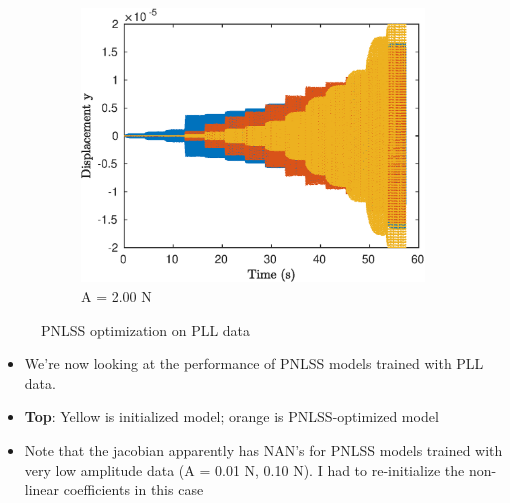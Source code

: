 \documentclass[aspectratio=169]{beamer}
\begin{document}
\begin{frame}[allowframebreaks]
\begin{figure}[!h]
    \begin{subfigure}[!h]{0.2\linewidth}
      \includegraphics[width=\linewidth]{../../benchmark4/FIGURES/TDOMPERF_PNLSS_PLL_famp20_nx23}
      \caption{A = 2.00 N}      
    \end{subfigure}
    \caption{PNLSS optimization on PLL data}
  \end{figure}
  \vspace{-1cm}
  \begin{itemize}
  \item We're now looking at the performance of PNLSS models
    trained with PLL data. 
  \item \textbf{Top}: Yellow is initialized model; orange is
    PNLSS-optimized model
  \item Note that the jacobian apparently has NAN's for PNLSS models
    trained with very low amplitude data (A = 0.01 N, 0.10 N). I had
    to re-initialize the non-linear coefficients in this case
  \end{itemize}


\end{frame}
\end{document}
